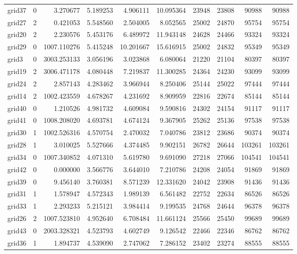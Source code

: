 \begin{longtable}{|l|r|r|r|r|r|r|r|r|r|}
grid37 & 0 & 3.270677 & 5.189253 & 4.906111 & 10.095364 & 23948 & 23808 & 90988 & 90988 \\
grid27 & 2 & 0.421053 & 5.548560 & 2.504005 & 8.052565 & 25002 & 24870 & 95754 & 95754 \\
grid20 & 2 & 2.230576 & 5.453176 & 6.489972 & 11.943148 & 24628 & 24466 & 93324 & 93324 \\
grid29 & 0 & 1007.110276 & 5.415248 & 10.201667 & 15.616915 & 25002 & 24832 & 95349 & 95349 \\
grid3 & 0 & 3003.253133 & 3.056196 & 3.023868 & 6.080064 & 21220 & 21104 & 80397 & 80397 \\
grid19 & 2 & 3006.471178 & 4.080448 & 7.219837 & 11.300285 & 24364 & 24230 & 93099 & 93099 \\
grid24 & 2 & 2.857143 & 4.283462 & 3.966944 & 8.250406 & 25144 & 25022 & 97444 & 97444 \\
grid14 & 2 & 1002.423559 & 4.678267 & 4.231692 & 8.909959 & 22816 & 22674 & 85144 & 85144 \\
grid40 & 0 & 1.210526 & 4.981732 & 4.609084 & 9.590816 & 24302 & 24154 & 91117 & 91117 \\
grid41 & 0 & 1008.208020 & 4.693781 & 4.674124 & 9.367905 & 25262 & 25136 & 97538 & 97538 \\
grid30 & 1 & 1002.526316 & 4.570754 & 2.470032 & 7.040786 & 23812 & 23686 & 90374 & 90374 \\
grid28 & 1 & 3.010025 & 5.527666 & 4.374485 & 9.902151 & 26782 & 26644 & 103261 & 103261 \\
grid34 & 0 & 1007.340852 & 4.071310 & 5.619780 & 9.691090 & 27218 & 27066 & 104541 & 104541 \\
grid42 & 0 & 0.000000 & 3.566776 & 3.644010 & 7.210786 & 24208 & 24054 & 91869 & 91869 \\
grid39 & 0 & 9.456140 & 3.760381 & 8.571239 & 12.331620 & 24042 & 23908 & 91436 & 91436 \\
grid31 & 1 & 1.578947 & 4.572343 & 1.989139 & 6.561482 & 22752 & 22634 & 86526 & 86526 \\
grid33 & 1 & 2.293233 & 5.215121 & 3.984414 & 9.199535 & 24768 & 24644 & 96378 & 96378 \\
grid26 & 2 & 1007.523810 & 4.952640 & 6.708484 & 11.661124 & 25566 & 25450 & 99689 & 99689 \\
grid43 & 0 & 2003.328321 & 4.523793 & 4.602749 & 9.126542 & 22466 & 22346 & 86762 & 86762 \\
grid36 & 1 & 1.894737 & 4.539090 & 2.747062 & 7.286152 & 23402 & 23274 & 88555 & 88555 \\

\end{longtable}
